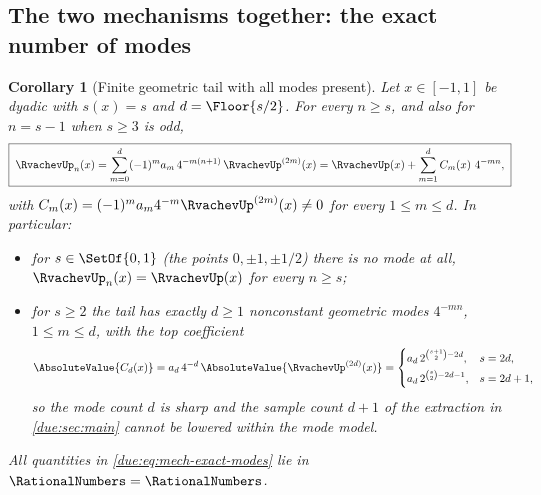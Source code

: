 \documentclass[11pt,oneside]{article}
\theoremstyle{plain}
\newtheorem{corollary}[theorem]{Corollary}
\theoremstyle{definition}
\theoremstyle{remark}
\newcommand{\Kk}{\RationalNumbers}                          %
\newcommand{\upn}[1]{\RvachevUp_{#1}}
\newcommand{\dep}[1]{s\!\left(#1\right)}                    %
\newcommand{\am}[1]{a_{#1}}                                 %
\newcommand{\Cr}[2]{C_{#1}\!\left(#2\right)}                %
\begin{document}
\subsection{The two mechanisms together: the exact number of modes}

\begin{corollary}[Finite geometric tail with all modes present]
\label{due:cor:mech-exact-modes}
Let \(x\in[-1,1]\) be dyadic with \(\dep{x}=s\) and \(d=\Floor{s/2}\).  For
every \(n\ge s\), and also for \(n=s-1\) when \(s\ge3\) is odd,
\begin{equation}
 \boxed{\;
 \upn{n}(x)=\sum_{m=0}^{d}(-1)^{m}\am{m}\,4^{-m(n+1)}\,\RvachevUp^{(2m)}(x)
 =\RvachevUp(x)+\sum_{m=1}^{d}\Cr{m}{x}\,4^{-mn},\;}
 \label{due:eq:mech-exact-modes}
\end{equation}
with \(\Cr{m}{x}=(-1)^{m}\am{m}4^{-m}\RvachevUp^{(2m)}(x)\ne0\) for every
\(1\le m\le d\).  In particular:
\begin{itemize}
\item for \(s\in\SetOf{0,1}\) (the points \(0,\pm1,\pm1/2\)) there is no
mode at all, \(\upn{n}(x)=\RvachevUp(x)\) for every \(n\ge s\);
\item for \(s\ge2\) the tail has exactly \(d\ge1\) nonconstant geometric
modes \(4^{-mn}\), \(1\le m\le d\), with the top coefficient
\begin{equation}
 \AbsoluteValue{\Cr{d}{x}}=\am{d}\,4^{-d}\,\AbsoluteValue{\RvachevUp^{(2d)}(x)}
 =\begin{cases}
 \am{d}\,2^{\binom{s+1}{2}-2d}, & s=2d,\\[0.3em]
 \am{d}\,2^{\binom{s}{2}-2d-1}, & s=2d+1,
 \end{cases}
 \label{due:eq:mech-top-mode}
\end{equation}
so the mode count \(d\) is sharp and the sample count \(d+1\) of the
extraction in \cref{due:sec:main} cannot be lowered within the mode model.
\end{itemize}
All quantities in \cref{due:eq:mech-exact-modes} lie in
\(\Kk=\RationalNumbers\).
\end{corollary}
\end{document}
